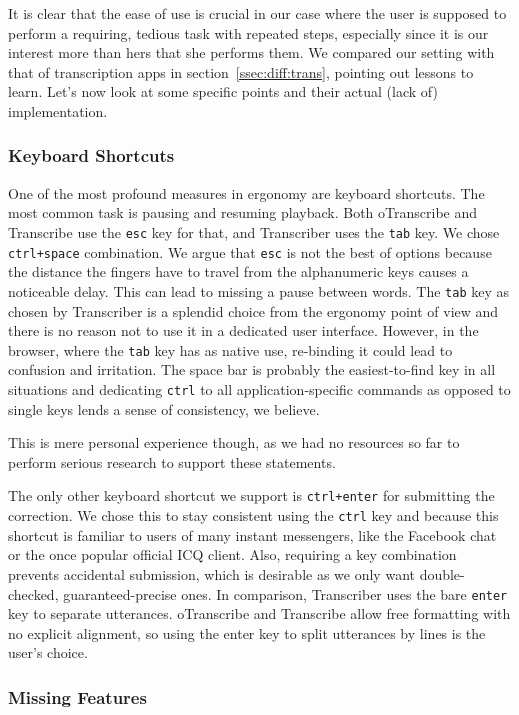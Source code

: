 \documentclass{svproc}
\begin{document}
It is clear that the ease of use is crucial in our case where the user is
supposed to perform a requiring, tedious task with repeated steps, especially
since it is our interest more than hers that she performs them. We compared our
setting with that of transcription apps in section~\ref{ssec:diff:trans},
pointing out lessons to learn. Let's now look at some specific points and their
actual (lack of) implementation.

\subsubsection{Keyboard Shortcuts}

One of the most profound measures in ergonomy are keyboard shortcuts. The most
common task is pausing and resuming playback. Both oTranscribe and Transcribe
use the \texttt{esc} key for that, and Transcriber uses the \texttt{tab} key.
We chose \texttt{ctrl+space} combination. We argue that \texttt{esc} is not the
best of options because the distance the fingers have to travel from the
alphanumeric keys causes a noticeable delay. This can lead to missing a pause
between words. The \texttt{tab} key as chosen by Transcriber is a splendid choice
from the ergonomy point of view and there is no reason not to use it in a
dedicated user interface. However, in the browser, where the \texttt{tab} key
has as native use, re-binding it could lead to confusion and irritation. The
space bar is probably the easiest-to-find key in all situations and dedicating
\texttt{ctrl} to all application-specific commands as opposed to single keys
lends a sense of consistency, we believe.

This is mere personal experience though, as we had no resources so far to
perform serious research to support these statements.

The only other keyboard shortcut we support is \texttt{ctrl+enter} for
submitting the correction. We chose this to stay consistent using the
\texttt{ctrl} key and because this shortcut is familiar to users of many instant
messengers, like the Facebook chat or the once popular official ICQ client.
Also, requiring a key combination prevents accidental submission, which is
desirable as we only want double-checked, guaranteed-precise ones. In
comparison, Transcriber uses the bare \texttt{enter} key to separate utterances.
oTranscribe and Transcribe allow free formatting with no explicit alignment, so
using the enter key to split utterances by lines is the user's choice.

\subsubsection{Missing Features}
\end{document}
